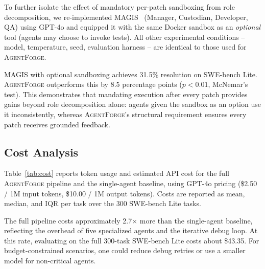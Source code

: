 \documentclass[journal]{IEEEtran}
\newcommand{\agentforge}{\textsc{AgentForge}}
\begin{document}
To further isolate the effect of mandatory per-patch sandboxing from role decomposition, we re-implemented MAGIS~\cite{tao2024magis} (Manager, Custodian, Developer, QA) using GPT-4o and equipped it with the same Docker sandbox as an \emph{optional} tool (agents may choose to invoke tests). All other experimental conditions -- model, temperature, seed, evaluation harness -- are identical to those used for \agentforge{}.

MAGIS with optional sandboxing achieves 31.5\% resolution on SWE-bench Lite. \agentforge{} outperforms this by 8.5 percentage points ($p < 0.01$, McNemar's test). This demonstrates that mandating execution after every patch provides gains beyond role decomposition alone: agents given the sandbox as an option use it inconsistently, whereas \agentforge{}'s structural requirement ensures every patch receives grounded feedback.

\subsection{Cost Analysis}
\label{sec:cost}

Table~\ref{tab:cost} reports token usage and estimated API cost for the full \agentforge{} pipeline and the single-agent baseline, using GPT-4o pricing (\$2.50 / 1M input tokens, \$10.00 / 1M output tokens). Costs are reported as mean, median, and IQR per task over the 300 SWE-bench Lite tasks.

\begin{table}[t]
\centering
\caption{Token usage and estimated API cost per task. IQR = interquartile range.}
\label{tab:cost}
\end{table}

The full pipeline costs approximately 2.7$\times$ more than the single-agent baseline, reflecting the overhead of five specialized agents and the iterative debug loop. At this rate, evaluating on the full 300-task SWE-bench Lite costs about \$43.35. For budget-constrained scenarios, one could reduce debug retries or use a smaller model for non-critical agents.
\end{document}
